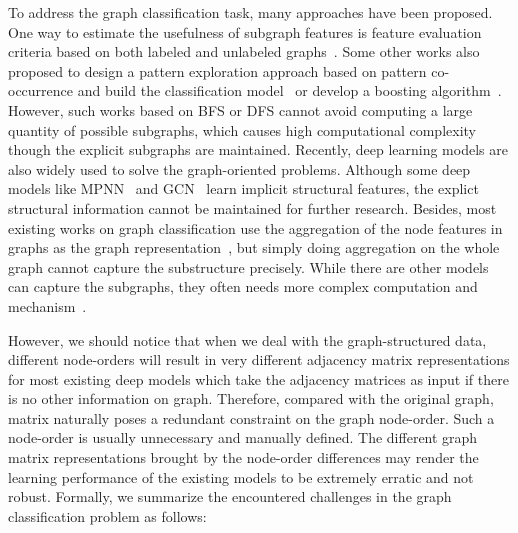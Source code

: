 \documentclass{article} \usepackage{iclr2020_conference,times}
\begin{document}
To address the graph classification task, many approaches have been proposed.  One way to estimate the usefulness of subgraph features is feature evaluation criteria based on both labeled and unlabeled graphs~\citet{kong2010semi}. Some other works also proposed to design a pattern exploration approach based on pattern co-occurrence and build the classification model~\citet{jin2009graph} or develop a boosting algorithm~\citet{wu2014boosting}. However, such works based on BFS or DFS cannot avoid computing a large quantity of  possible subgraphs, which causes high computational complexity though the explicit subgraphs are maintained.  Recently, deep learning models are also widely used to solve the graph-oriented problems.  Although some deep models like MPNN~\cite{gilmer2017neural} and GCN~\cite{kipf2016semi} learn  implicit structural features, the explict structural information cannot be maintained for further research. Besides, most existing works on graph classification use the aggregation of the node features in graphs  as the graph representation~\cite{xu2018powerful, hamilton2017inductive}, but simply doing aggregation on the whole graph cannot capture the substructure precisely. While there are other models can capture the subgraphs, they often needs more complex computation and mechanism~\cite{wang2017structural, narayanan2017graph2vec}.


However, we should notice that when we deal with the graph-structured data, different node-orders will result in very different adjacency matrix representations for most existing deep models which take the adjacency matrices as input if there is no other information on graph.  Therefore, compared with the original graph, matrix naturally poses a redundant constraint on the graph node-order. Such a node-order is usually unnecessary and manually defined. The different graph matrix representations brought by the node-order differences may render the learning performance of the existing models to be extremely erratic and not robust. Formally, we summarize the encountered challenges in the graph classification problem as follows:
\end{document}
